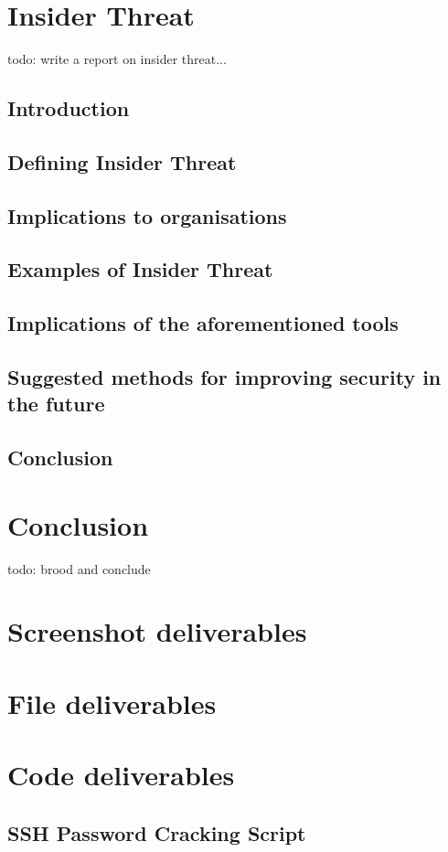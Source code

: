 \documentclass[12pt]{report}
\begin{document}
\pagebreak
\chapter{Insider Threat}
todo: write a report on insider threat...
\section{Introduction}
\section{Defining Insider Threat}
\section{Implications to organisations}
\section{Examples of Insider Threat}
\section{Implications of the aforementioned tools}
\section{Suggested methods for improving security in the future}
\section{Conclusion}


\pagebreak
\chapter{Conclusion}
todo: brood and conclude




\nocite{example:referenceid:here}

\begin{flushleft}
  
\end{flushleft}


\appendix

\pagebreak
\chapter{Screenshot deliverables}
\label{app:screenshots}

\pagebreak
\chapter{File deliverables}
\label{app:files}

\pagebreak
\chapter{Code deliverables}
\section{SSH Password Cracking Script}
\label{app:code:sshcrack_mp}

\end{document}
